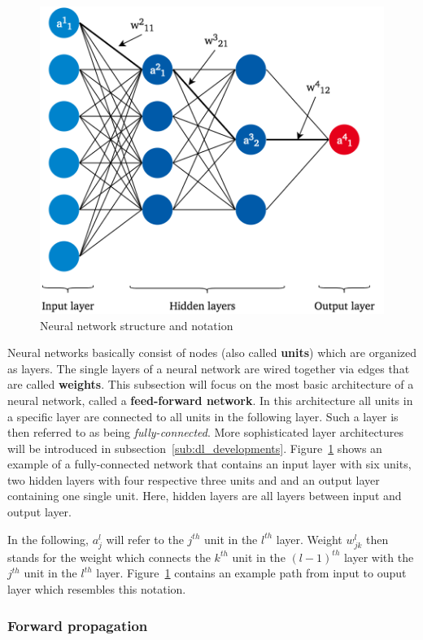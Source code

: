 \begin{figure}[h]
  \centering
  \includegraphics[height=10cm]{img/nn_architecture_2}
  \caption{Neural network structure and notation}
\label{fig:nn_architecture}
\end{figure}

Neural networks basically consist of nodes (also called \textbf{units}) which
are organized as layers.
The single layers of a neural network are wired together via edges that are
called \textbf{weights}.
This subsection will focus on the most basic architecture of a neural network,
called a \textbf{feed-forward network}.
In this architecture all units in a specific layer are connected to all units
in the following layer.
Such a layer is then referred to as being \textit{fully-connected}.
More sophisticated layer architectures will be introduced in subsection~\ref{sub:dl_developments}.
Figure~\ref{fig:nn_architecture} shows an example of a fully-connected network
that contains an input layer with six units, two hidden layers with four respective
three units and and an output layer containing one single unit.
Here, hidden layers are all layers between input and output layer.

In the following, $a_j^l$ will refer to the $j^{th}$ unit in the $l^{th}$ layer.
Weight $w_{jk}^l$ then stands for the weight which connects the $k^{th}$ unit in
the ${(l-1)}^{th}$ layer with the $j^{th}$ unit in the $l^{th}$ layer.
Figure~\ref{fig:nn_architecture} contains an example path from input to ouput
layer which resembles this notation.

\subsubsection{Forward propagation}
\label{sub:dl_forward}

